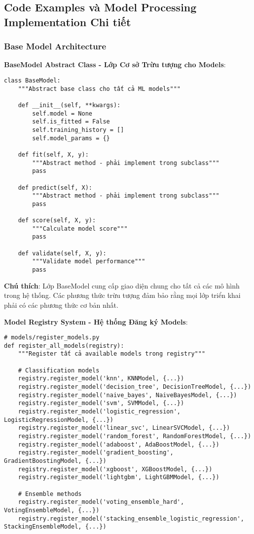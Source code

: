 \subsection{Code Examples và Model Processing Implementation Chi tiết}

\subsubsection{Base Model Architecture}

\textbf{BaseModel Abstract Class - Lớp Cơ sở Trừu tượng cho Models}:

\begin{verbatim}
class BaseModel:
    """Abstract base class cho tất cả ML models"""
    
    def __init__(self, **kwargs):
        self.model = None
        self.is_fitted = False
        self.training_history = []
        self.model_params = {}
        
    def fit(self, X, y):
        """Abstract method - phải implement trong subclass"""
        pass
        
    def predict(self, X):
        """Abstract method - phải implement trong subclass"""
        pass
        
    def score(self, X, y):
        """Calculate model score"""
        pass
        
    def validate(self, X, y):
        """Validate model performance"""
        pass
\end{verbatim}

\textbf{Chú thích}: Lớp BaseModel cung cấp giao diện chung cho tất cả các mô hình trong hệ thống. Các phương thức trừu tượng đảm bảo rằng mọi lớp triển khai phải có các phương thức cơ bản nhất.

\textbf{Model Registry System - Hệ thống Đăng ký Models}:

\begin{verbatim}
# models/register_models.py
def register_all_models(registry):
    """Register tất cả available models trong registry"""
    
    # Classification models  
    registry.register_model('knn', KNNModel, {...})
    registry.register_model('decision_tree', DecisionTreeModel, {...})
    registry.register_model('naive_bayes', NaiveBayesModel, {...})
    registry.register_model('svm', SVMModel, {...})
    registry.register_model('logistic_regression', LogisticRegressionModel, {...})
    registry.register_model('linear_svc', LinearSVCModel, {...})
    registry.register_model('random_forest', RandomForestModel, {...})
    registry.register_model('adaboost', AdaBoostModel, {...})
    registry.register_model('gradient_boosting', GradientBoostingModel, {...})
    registry.register_model('xgboost', XGBoostModel, {...})
    registry.register_model('lightgbm', LightGBMModel, {...})
    
    # Ensemble methods
    registry.register_model('voting_ensemble_hard', VotingEnsembleModel, {...})
    registry.register_model('stacking_ensemble_logistic_regression', StackingEnsembleModel, {...})
\end{verbatim}

